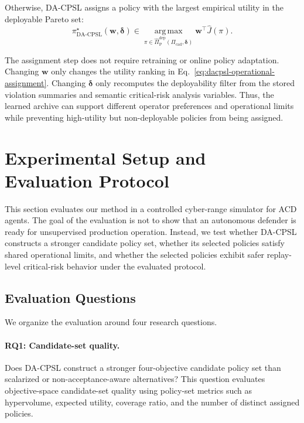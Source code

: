 \documentclass[sigconf,review,anonymous]{acmart}
\begin{document}
Otherwise, DA-CPSL assigns a policy with the largest empirical utility in
the deployable Pareto set:
\begin{equation}
\pi_{\mathrm{DA\mbox{-}CPSL}}^{\star}
(\mathbf{w},\boldsymbol{\delta})
\in
\operatorname*{arg\,max}_{\pi\in
\widehat{\Pi}_{\mathrm{P}}^{\mathrm{dep}}
(\Pi_{\mathrm{cad}},\boldsymbol{\delta})}
\mathbf{w}^{\top}
\widehat{J}(\pi).
\label{eq:dacpsl-operational-assignment}
\end{equation}

The assignment step does not require retraining or online policy adaptation.
Changing \(\mathbf{w}\) only changes the utility ranking in Eq.~\ref{eq:dacpsl-operational-assignment}. Changing \(\boldsymbol{\delta}\) only recomputes the deployability filter from the stored violation summaries and semantic critical-risk analysis variables.
Thus, the learned archive can support different operator preferences and operational limits while preventing high-utility but non-deployable policies from being assigned.


\section{Experimental Setup and Evaluation Protocol}
\label{sec:evaluation-setup}

This section evaluates our method in a controlled cyber-range simulator
for ACD agents. The goal of the evaluation is not to show that an
autonomous defender is ready for unsupervised production operation.
Instead, we test whether DA-CPSL constructs a stronger candidate policy
set, whether its selected policies satisfy shared operational limits, and
whether the selected policies exhibit safer replay-level critical-risk
behavior under the evaluated protocol.

\subsection{Evaluation Questions}
\label{subsec:eval-questions}

We organize the evaluation around four research questions.

\paragraph{RQ1: Candidate-set quality.}
Does DA-CPSL construct a stronger four-objective candidate policy set
than scalarized or non-acceptance-aware alternatives? This question
evaluates objective-space candidate-set quality using policy-set metrics
such as hypervolume, expected utility, coverage ratio, and the number of
distinct assigned policies.
\end{document}
